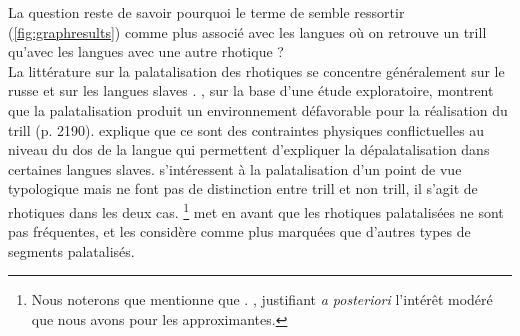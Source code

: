 La question reste de savoir pourquoi le terme de  semble ressortir (\autoref{fig:graphresults}) comme plus associé avec les langues où on retrouve un trill qu'avec les langues avec une autre rhotique ?\\

La littérature sur la palatalisation des rhotiques se concentre généralement sur le russe et sur les langues slaves \parencite{proctorGesturalCharacterizationPhonological2009,kavitskayaTrillsPalatalizationConsequences2009,kochetovIncompatibilityTrillingPalatalization2015}. \textcite{kochetovIncompatibilityTrillingPalatalization2015}, sur la base d'une étude exploratoire, montrent que la palatalisation produit un environnement défavorable pour la réalisation du trill (p. 2190). \textcite{kavitskayaTrillsPalatalizationConsequences2009} explique que ce sont des contraintes physiques conflictuelles au niveau du dos de la langue qui permettent d'expliquer la dépalatalisation dans certaines langues slaves. \textcite{dickey1997phonology,hallTypologicalGeneralizationsConcerning2000} s'intéressent à la palatalisation d'un point de vue typologique mais ne font pas de distinction entre trill et non trill, il s'agit de rhotiques dans les deux cas. \textcite{hallTypologicalGeneralizationsConcerning2000}\footnote{Nous noterons que \citeauthor{hallTypologicalGeneralizationsConcerning2000} mentionne que . \parencite[8]{hallTypologicalGeneralizationsConcerning2000}, justifiant \textit{a posteriori} l'intérêt modéré que nous avons pour les approximantes.} met en avant que les rhotiques palatalisées ne sont pas fréquentes, et les considère comme  plus marquées que d'autres types de segments palatalisés.\\ %

